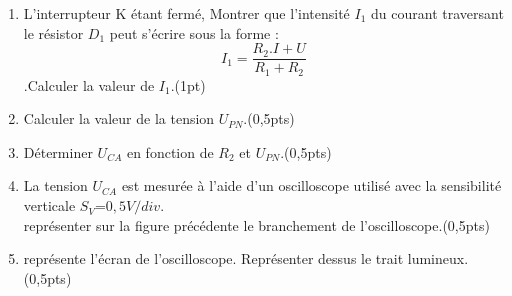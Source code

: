 \documentclass[12pt]{article}
\begin{document}
\begin{enumerate}

	\item L’interrupteur K étant fermé, Montrer que l’intensité $I_1$ du courant traversant le résistor $D_1$ peut s’écrire sous la forme : 
		$$I_1 = \frac{R_2.I + U}{R_1 + R_2}$$ .Calculer la valeur de $I_1$.\dotfill(1pt)
	\item Calculer la valeur de la tension $U_{PN}$.\dotfill(0,5pts)
	\item Déterminer $U_{CA}$ en fonction de $R_2$ et $U_{PN}$.\dotfill(0,5pts)
	\item La tension $U_{CA}$ est mesurée à l’aide d’un oscilloscope
utilisé avec la sensibilité verticale $S_V$=$0,5 V/div$. \\représenter sur la figure précédente le branchement de
l’oscilloscope.\dotfill(0,5pts)
\item représente l’écran de
l’oscilloscope. Représenter dessus le trait lumineux.\dotfill(0,5pts)
\end{enumerate}
\end{document}

